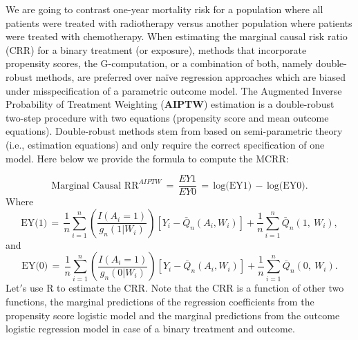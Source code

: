 \documentclass[
]{article}
\newenvironment{Shaded}{\begin{snugshade}}{\end{snugshade}}
\newcommand{\CommentTok}[1]{\textcolor[rgb]{0.56,0.35,0.01}{\textit{#1}}}
\newcommand{\DataTypeTok}[1]{\textcolor[rgb]{0.13,0.29,0.53}{#1}}
\newcommand{\DecValTok}[1]{\textcolor[rgb]{0.00,0.00,0.81}{#1}}
\newcommand{\FloatTok}[1]{\textcolor[rgb]{0.00,0.00,0.81}{#1}}
\newcommand{\KeywordTok}[1]{\textcolor[rgb]{0.13,0.29,0.53}{\textbf{#1}}}
\newcommand{\NormalTok}[1]{#1}
\newcommand{\OperatorTok}[1]{\textcolor[rgb]{0.81,0.36,0.00}{\textbf{#1}}}
\newcommand{\StringTok}[1]{\textcolor[rgb]{0.31,0.60,0.02}{#1}}
\begin{document}
\begin{Shaded}
\end{Shaded}

We are going to contrast one-year mortality risk for a population where
all patients were treated with radiotherapy versus another population
where patients were treated with chemotherapy. When estimating the
marginal causal risk ratio (CRR) for a binary treatment (or exposure),
methods that incorporate propensity scores, the G-computation, or a
combination of both, namely double-robust methods, are preferred over
naïve regression approaches which are biased under misspecification of a
parametric outcome model. The Augmented Inverse Probability of Treatment
Weighting (\textbf{AIPTW}) estimation is a double-robust two-step
procedure with two equations (propensity score and mean outcome
equations). Double-robust methods stem from based on semi-parametric
theory (i.e., estimation equations) and only require the correct
specification of one model. Here below we provide the formula to compute
the MCRR:

\[\text{Marginal Causal RR}^{AIPTW}\,=\,\frac{EY1}{EY0}\,=\,\text{log(EY1)}\,-\,\text{log(EY0)}.\]
Where
\[\text{EY(1)}\,=\,\frac{1}{n}\sum_{i=1}^{n}\left(\frac{I\left(A_{i}=1\right)}{g_n(1|W_{i})}\right)\left[Y_{i}-\bar{Q}_{n}\left(A_{i},W_{i}\right)\right]+\frac{1}{n}\sum_{i=1}^{n}\bar{Q}_{n}\left(1,\ W_{i}\right),\]
and
\[\text{EY(0)}\,=\,\frac{1}{n}\sum_{i=1}^{n}\left(\frac{I\left(A_{i}=1\right)}{g_n(0|W_{i})}\right)\left[Y_{i}-\bar{Q}_{n}\left(A_{i},W_{i}\right)\right]+\frac{1}{n}\sum_{i=1}^{n}\bar{Q}_{n}\left(0,\ W_{i}\right).\]
Let\('\)s use R to estimate the CRR. Note that the CRR is a function of
other two functions, the marginal predictions of the regression
coefficients from the propensity score logistic model and the marginal
predictions from the outcome logistic regression model in case of a
binary treatment and outcome.
\end{document}
